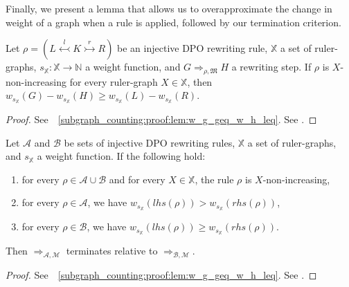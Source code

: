 Finally, we present a lemma that allows us to overapproximate the change in weight of a graph when a rule is applied, followed by our termination criterion. 

\begin{lemma}
    \label{subgraph_counting:lem:w_g_geq_w_h_leq}
    Let $\rho = (L \overset{l}{\leftarrowtail} K \overset{r}{\rightarrowtail} R)$ be an injective DPO rewriting rule,
    \( \mathbb{X} \) a set of ruler-graphs,
    \( s_{\mathbb{X}} \colon \mathbb{X} \to \mathbb{N} \) a weight function,
    and \( G \Rightarrow_{\rho,\mathfrak{M}} H \) a rewriting step. 
    If $\rho$ is \( X \)-non-increasing for every ruler-graph \( X \in \mathbb{X} \), then $
        w_{s_\mathbb{X}}(G) - w_{s_\mathbb{X}}(H) 
        \geq 
        w_{s_\mathbb{X}}(L) - w_{s_\mathbb{X}}(R)
    $.
\end{lemma}
\begin{proof}
    \iflongversion
        See~\textsection~\ref{subgraph_counting:proof:lem:w_g_geq_w_h_leq}.
    \else
        See \cite[Lemma 41]{qiu2025termination}.
    \fi 
\end{proof} 
\begin{theorem}[Termination] 
    \label{subgraph_counting:thm:termination_grs}
    Let \(\mathcal{A}\) and \(\mathcal{B}\) be sets of injective DPO rewriting rules, $\mathbb{X}$ a set of ruler-graphs, and $s_\mathbb{X}$ a weight function. If the following hold:
    \begin{enumerate}
        \item  for every $\rho \in \mathcal{A} \cup \mathcal{B}$ and for every $X \in \mathbb{X}$, the rule $\rho$ is $X$-non-increasing,
        \item for every \(\rho \in \mathcal{A}\), we have \( w_{s_\mathbb{X}}(lhs(\rho)) > w_{s_\mathbb{X}}(rhs(\rho)) \),
        \item for every \(\rho \in \mathcal{B}\), we have \( w_{s_\mathbb{X}}(lhs(\rho)) \geq w_{s_\mathbb{X}}(rhs(\rho)) \).
    \end{enumerate}
    Then \(\Rightarrow_{\mathcal{A},\mathcal{M}}\) terminates relative to \(\Rightarrow_{\mathcal{B},\mathcal{M}}\).
\end{theorem}
\begin{proof}
    \iflongversion
        See~\textsection~\ref{subgraph_counting:proof:lem:w_g_geq_w_h_leq}.
    \else
        See \cite[Lemma 41]{qiu2025termination}.
    \fi 
\end{proof} 